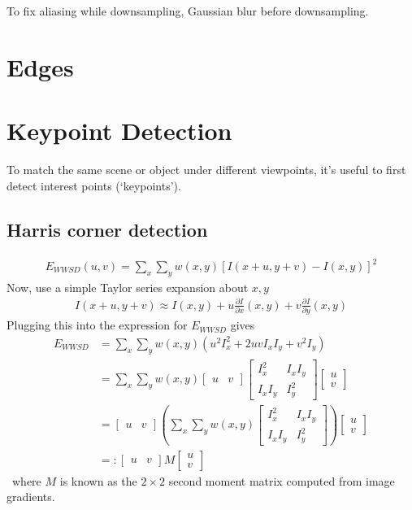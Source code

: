 \documentclass[11pt]{article}
\begin{document}
To fix aliasing while downsampling, Gaussian blur before downsampling. 



\section{Edges}

\section{Keypoint Detection}
To match the same scene or object under different viewpoints, it's useful to first detect interest points (`keypoints'). 

\subsection{Harris corner detection}
\begin{align*}
    E_{WWSD} (u,v) = \sum_x \sum_y w(x,y) [I(x+u, y+v) - I(x,y)]^2 
\end{align*}
Now, use a simple Taylor series expansion about $x,y$
\begin{align*}
    I(x + u, y+ v) \approx I(x,y) + u\frac{\partial I}{\partial x} (x,y) + v \frac{\partial I }{\partial y} (x,y) 
\end{align*}
Plugging this into the expression for $E_{WWSD}$ gives
\begin{align*}
    E_{WWSD} &= \sum_x \sum_y w(x,y) (u^2 I_x^2 + 2uv I_x I_y + v^2 I_y) \\
    &= \sum_x \sum_y w(x,y) 
    \begin{bmatrix}
        u & v 
    \end{bmatrix} 
    \begin{bmatrix}
        I_x^2 & I_x I_y \\ I_x I_y & I_y^2 
    \end{bmatrix}
    \begin{bmatrix}
        u \\ v
    \end{bmatrix} \\
    &= \begin{bmatrix}
        u & v 
    \end{bmatrix} \left( 
    \sum_x \sum_y w(x,y) 
    \begin{bmatrix}
        I_x^2 & I_x I_y \\ I_x I_y & I_y^2 
    \end{bmatrix} \right) 
    \begin{bmatrix}
        u \\ v
    \end{bmatrix} \\
    &=: \begin{bmatrix}
        u & v
    \end{bmatrix}
    M \begin{bmatrix}
        u \\ v 
    \end{bmatrix}
\end{align*}\
where $M$ is known as the $2\times 2$ second moment matrix computed from image gradients. 
\end{document}
